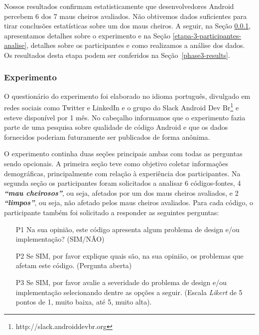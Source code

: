 Nossos resultados confirmam estatisticamente que desenvolvedores Android percebem 6 dos 7 maus cheiros avaliados. Não obtivemos dados suficientes para tirar conclusões estatísticas sobre um dos maus cheiros. A seguir, na Seção \ref{etapa-3-experimento}, apresentamos detalhes sobre o experimento e na Seção \ref{etapa-3-participantes-analise}, detalhes sobre os participantes e como realizamos a análise dos dados. Os resultados desta etapa podem ser conferidos na Seção~\ref{phase3-results}.


\subsubsection{Experimento}
\label{etapa-3-experimento}

O questionário do experimento foi elaborado no idioma português, divulgado em redes sociais como Twitter e LinkedIn e o grupo do Slack Android Dev Br\footnote{http://slack.androiddevbr.org} e esteve disponível por 1 mês. No cabeçalho informamos que o experimento fazia parte de uma pesquisa sobre qualidade de código Android e que os dados fornecidos poderiam futuramente ser publicados de forma anônima. 

O experimento continha duas seções principais ambas com todas as perguntas sendo opcionais. A primeira seção teve como objetivo coletar informações demográficas, principalmente com relação à experiência dos participantes. Na segunda seção os participantes foram solicitados a analisar 6 códigos-fontes, 4 \textbf{\small \textit{``mau cheirosos''}}, ou seja, afetados por um dos maus cheiros avaliados, e 2 \textbf{\small \textit{``limpos''}}, ou seja, não afetado pelos maus cheiros avaliados. Para cada código, o participante também foi solicitado a responder as seguintes perguntas:

\noindent 
\begin{itemize}
  \item[P1] Na sua opinião, este código apresenta algum problema de design e/ou implementação? (SIM/NÃO)
  \item[P2] Se SIM, por favor explique quais são, na sua opinião, os problemas que afetam este código. (Pergunta aberta)
  \item[P3] Se SIM, por favor avalie a severidade do problema de design e/ou implementação selecionando dentre as opções a seguir. (Escala \textit{Likert} de 5 pontos de 1, muito baixa, até 5, muito alta).
\end{itemize}

